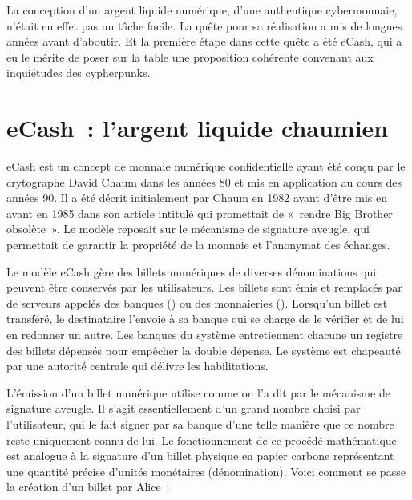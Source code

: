 La conception d'un argent liquide numérique, d'une authentique cybermonnaie, n'était en effet pas un tâche facile. La quête pour sa réalisation a mis de longues années avant d'aboutir. Et la première étape dans cette quête a été eCash, qui a eu le mérite de poser sur la table une proposition cohérente convenant aux inquiétudes des cypherpunks.

\section*{eCash~: l'argent liquide chaumien}

eCash est un concept de monnaie numérique confidentielle ayant été conçu par le crytographe David Chaum dans les années 80 et mis en application au cours des années 90. Il a été décrit initialement par Chaum en 1982 avant d'être mis en avant en 1985 dans son article intitulé  qui promettait de «~rendre Big Brother obsolète~». Le modèle reposait sur le mécanisme de signature aveugle, qui permettait de garantir la propriété de la monnaie et l'anonymat des échanges.

Le modèle eCash gère des billets numériques de diverses dénominations qui peuvent être conservés par les utilisateurs. Les billets sont émis et remplacés par de serveurs appelés des banques () ou des monnaieries (). Lorsqu'un billet est transféré, le destinataire l'envoie à sa banque qui se charge de le vérifier et de lui en redonner un autre. Les banques du système entretiennent chacune un registre des billets dépensés pour empêcher la double dépense. Le système est chapeauté par une autorité centrale qui délivre les habilitations.

L'émission d'un billet numérique utilise comme on l'a dit par le mécanisme de signature aveugle. Il s'agit essentiellement d'un grand nombre choisi par l'utilisateur, qui le fait signer par sa banque d'une telle manière que ce nombre reste uniquement connu de lui. Le fonctionnement de ce procédé mathématique est analogue à la signature d'un billet physique en papier carbone représentant une quantité précise d'unités monétaires (dénomination). Voici comment se passe la création d'un billet par Alice~:

